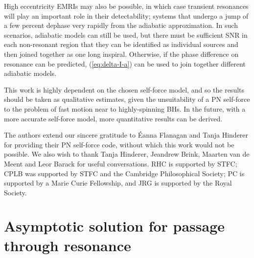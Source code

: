 \documentclass[aps,prd,amsfonts,amssymb,amsmath,nofootinbib,reprint,showpacs,superscriptaddress,twocolumn]{revtex4}
\newcommand{\eqnref}[1]{(\ref{eq:#1})}
\begin{document}
High eccentricity EMRIs may also be possible, in which case transient resonances will play an important role in their detectability; systems that undergo a jump of a few percent dephase very rapidly from the adiabatic approximation. In such scenarios, adiabatic models can still be used, but there must be sufficient SNR in each non-resonant region that they can be identified as individual sources and then joined together as one long inspiral. Otherwise, if the phase difference on resonance can be predicted, \eqnref{delta-I-a} can be used to join together different adiabatic models.

This work is highly dependent on the chosen self-force model, and so the results should be taken as qualitative estimates, given the unsuitability of a PN self-force to the problem of fast motion near to highly-spinning BHs. In the future, with a more accurate self-force model, more quantitative results can be derived.

\begin{acknowledgments}
The authors extend our sincere gratitude to \'{E}anna Flanagan and Tanja Hinderer for providing their PN self-force code, without which this work would not be possible. We also wish to thank Tanja Hinderer, Jeandrew Brink, Maarten van de Meent and Leor Barack for useful conversations. RHC is supported by STFC; CPLB was supported by STFC and the Cambridge Philosophical Society; PC is supported by a Marie Curie Fellowship, and JRG is supported by the Royal Society.
\end{acknowledgments}

\appendix

\section{Asymptotic solution for passage through resonance}\label{sec:res-asymptotic}




\end{document}
